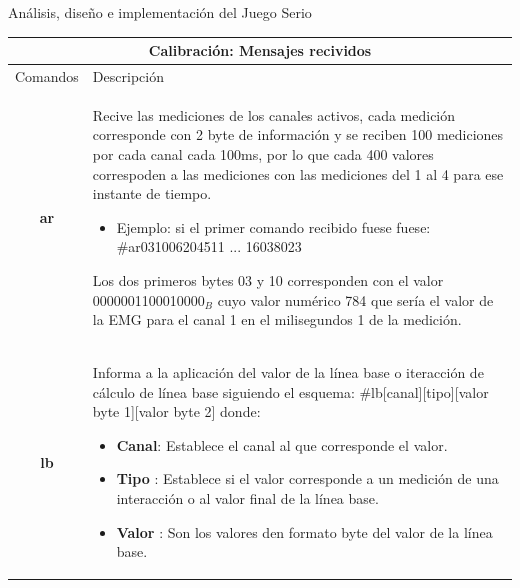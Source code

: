 \begin{thesischapter}{2} {Análisis, diseño e implementación del Juego Serio}
\begin{table}[ht]
    \centering
    \begin{tabular}{ |c|p{14cm}|}
        \hline
        \multicolumn{2}{|c|}{Calibración: Mensajes recividos} \\
        \hline
        Comandos        &   Descripción \\\hline
        \textbf{ar}     &   \begin{minipage}{14cm}
                                \vspace{2pt}    
                                Recive las mediciones de los canales activos, cada medición corresponde con 2 byte de información y se reciben 100 mediciones por cada canal cada 100ms, 
                                por lo que cada 400 valores correspoden a las mediciones con las mediciones del 1 al 4 para ese instante de tiempo.
                                \begin{itemize}
                                    \item Ejemplo: si el primer comando recibido fuese fuese: \#ar031006204511 ... 16038023
                                \end{itemize}
                                Los dos primeros bytes 03 y 10 corresponden con el valor 0000001100010000$_{B}$ cuyo valor numérico  784 que sería el valor de la EMG para el canal 1 en el milisegundos 
                                1 de la medición.
                                \vspace{2pt}    
                            \end{minipage}\\\hline    
        \textbf{lb}     &   \begin{minipage}{14cm}
                                \vspace{1pt}
                                Informa a la aplicación del valor de la línea base o iteracción de cálculo de línea base siguiendo el esquema: \#lb[canal][tipo][valor byte 1][valor byte 2] donde:
                                \begin{itemize}
                                    \item \textbf{Canal}: Establece el canal al que corresponde el valor.
                                    \item \textbf{Tipo} : Establece si el valor corresponde a un medición de una interacción o al valor final de la línea base.
                                    \item \textbf{Valor} : Son los valores den formato byte del valor de la línea base.  

\end{itemize}
\end{minipage}
\end{tabular}
\end{table}
\end{thesischapter}
